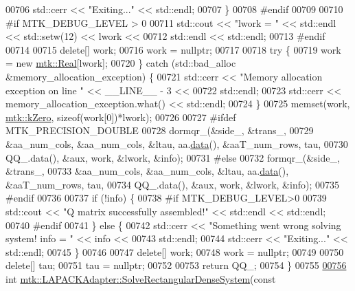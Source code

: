 \begin{DoxyCode}
00706     std::cerr << \textcolor{stringliteral}{"Exiting..."} << std::endl;
00707   \}
00708 \textcolor{preprocessor}{  #endif}
00709 
00710 \textcolor{preprocessor}{  #if MTK\_DEBUG\_LEVEL > 0}
00711   std::cout << \textcolor{stringliteral}{"lwork = "} << std::endl << std::setw(12) << lwork <<
00712     std::endl << std::endl;
00713 \textcolor{preprocessor}{  #endif}
00714 
00715   \textcolor{keyword}{delete}[] work;
00716   work = \textcolor{keyword}{nullptr};
00717 
00718   \textcolor{keywordflow}{try} \{
00719     work = \textcolor{keyword}{new} \hyperlink{group__c01-roots_gac080bbbf5cbb5502c9f00405f894857d}{mtk::Real}[lwork];
00720   \} \textcolor{keywordflow}{catch} (std::bad\_alloc &memory\_allocation\_exception) \{
00721     std::cerr << \textcolor{stringliteral}{"Memory allocation exception on line "} << \_\_LINE\_\_ - 3 <<
00722       std::endl;
00723     std::cerr << memory\_allocation\_exception.what() << std::endl;
00724   \}
00725   memset(work, \hyperlink{group__c01-roots_ga59a451a5fae30d59649bcda274fea271}{mtk::kZero}, \textcolor{keyword}{sizeof}(work[0])*lwork);
00726 
00727 \textcolor{preprocessor}{  #ifdef MTK\_PRECISION\_DOUBLE}
00728   dormqr\_(&side\_, &trans\_,
00729           &aa\_num\_cols, &aa\_num\_cols, &ltau, aa.\hyperlink{classmtk_1_1DenseMatrix_a16b3ff56feb2658b9fc7147d1de4d8e7}{data}(), &aaT\_num\_rows, tau,
00730           QQ\_.data(), &aux, work, &lwork, &info);
00731 \textcolor{preprocessor}{  #else}
00732   formqr\_(&side\_, &trans\_,
00733           &aa\_num\_cols, &aa\_num\_cols, &ltau, aa.\hyperlink{classmtk_1_1DenseMatrix_a16b3ff56feb2658b9fc7147d1de4d8e7}{data}(), &aaT\_num\_rows, tau,
00734           QQ\_.data(), &aux, work, &lwork, &info);
00735 \textcolor{preprocessor}{  #endif}
00736 
00737   \textcolor{keywordflow}{if} (!info) \{
00738 \textcolor{preprocessor}{    #if MTK\_DEBUG\_LEVEL>0}
00739     std::cout << \textcolor{stringliteral}{"Q matrix successfully assembled!"} << std::endl << std::endl;
00740 \textcolor{preprocessor}{    #endif}
00741   \} \textcolor{keywordflow}{else} \{
00742     std::cerr << \textcolor{stringliteral}{"Something went wrong solving system! info = "} << info <<
00743       std::endl;
00744     std::cerr << \textcolor{stringliteral}{"Exiting..."} << std::endl;
00745   \}
00746 
00747   \textcolor{keyword}{delete}[] work;
00748   work = \textcolor{keyword}{nullptr};
00749 
00750   \textcolor{keyword}{delete}[] tau;
00751   tau = \textcolor{keyword}{nullptr};
00752 
00753   \textcolor{keywordflow}{return} QQ\_;
00754 \}
00755 
\hypertarget{mtk__lapack__adapter_8cc_source_l00756}{}\hyperlink{classmtk_1_1LAPACKAdapter_a380f148ffdf96bae2f79ae28f1a6560c}{00756} \textcolor{keywordtype}{int} \hyperlink{classmtk_1_1LAPACKAdapter_a380f148ffdf96bae2f79ae28f1a6560c}{mtk::LAPACKAdapter::SolveRectangularDenseSystem}(\textcolor{keyword}{const} 

\end{DoxyCode}
